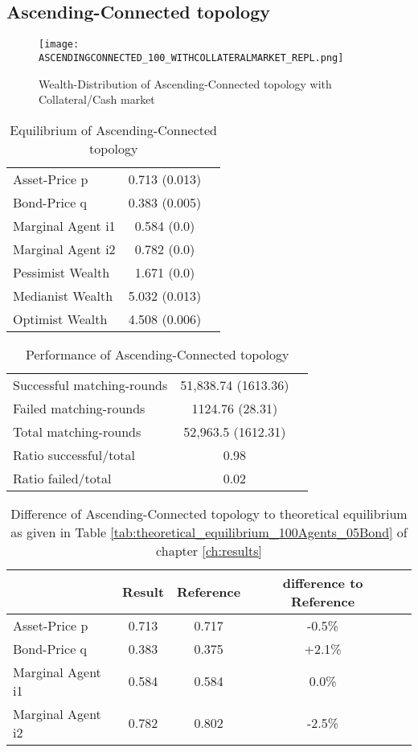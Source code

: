 \documentclass[Bachelorarbeit.tex]{subfiles}
\begin{document}
\subsection{Ascending-Connected topology}
\begin{figure}[H]
	\centering
  \texttt{[image: ASCENDINGCONNECTED\_100\_WITHCOLLATERALMARKET\_REPL.png]}
	\caption{Wealth-Distribution of Ascending-Connected topology with Collateral/Cash market}
	\label{fig:wealth_ASCENDINGCONNECTED_100_WITHCOLLATERALMARKET_REPL}
\end{figure}

\begin{table}[H]
	\caption{Equilibrium of Ascending-Connected topology}
	\centering
	\begin{tabular} { l c r }
		\hline
		Asset-Price p & 0.713 (0.013) \\
		Bond-Price q & 0.383 (0.005) \\
		Marginal Agent i1 & 0.584 (0.0) \\
		Marginal Agent i2 & 0.782 (0.0) \\
		\hline
		Pessimist Wealth & 1.671 (0.0) \\
		Medianist Wealth & 5.032 (0.013) \\
		Optimist Wealth & 4.508 (0.006) \\
		\hline
	\end{tabular}
\end{table} 

\begin{table}[H]
	\caption{Performance of Ascending-Connected topology}
	\centering
	\begin{tabular} { l c r }
		\hline
		Successful matching-rounds & 51,838.74 (1613.36) \\
		Failed matching-rounds & 1124.76 (28.31) \\
		Total matching-rounds & 52,963.5 (1612.31) \\
		\hline
		Ratio successful/total & 0.98 \\
		Ratio failed/total & 0.02 \\
		\hline
	\end{tabular}
\end{table}

\begin{table}[H]
	\caption{Difference of Ascending-Connected topology to theoretical equilibrium as given in Table \ref{tab:theoretical_equilibrium_100Agents_05Bond} of chapter \ref{ch:results}}
	\centering
	\begin{tabular} { l c c c r }
		& Result & Reference & difference to Reference \\
		\hline
		Asset-Price p & 0.713 & 0.717 & -0.5\% \\
		Bond-Price q & 0.383 & 0.375 & +2.1\% \\
		Marginal Agent i1 & 0.584 & 0.584 & 0.0\% \\
		Marginal Agent i2 & 0.782 & 0.802 & -2.5\% \\
		\hline
	\end{tabular}
\end{table} 
\end{document}
